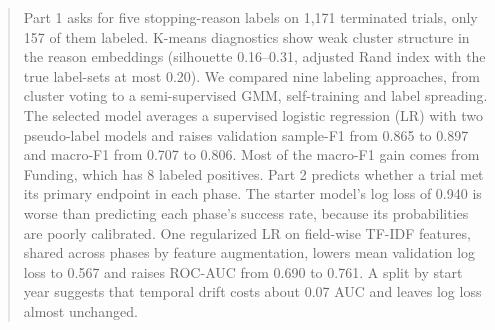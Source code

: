 \begin{abstract}
Part 1 asks for five stopping-reason labels on 1,171 terminated trials, only 157 of them labeled.
K-means diagnostics show weak cluster structure in the reason embeddings (silhouette 0.16--0.31, adjusted Rand index with the true label-sets at most 0.20).
We compared nine labeling approaches, from cluster voting to a semi-supervised GMM, self-training and label spreading.
The selected model averages a supervised logistic regression (LR) with two pseudo-label models and raises validation sample-F1 from 0.865 to 0.897 and macro-F1 from 0.707 to 0.806.
Most of the macro-F1 gain comes from Funding, which has 8 labeled positives.
Part 2 predicts whether a trial met its primary endpoint in each phase.
The starter model's log loss of 0.940 is worse than predicting each phase's success rate, because its probabilities are poorly calibrated.
One regularized LR on field-wise TF-IDF features, shared across phases by feature augmentation, lowers mean validation log loss to 0.567 and raises ROC-AUC from 0.690 to 0.761.
A split by start year suggests that temporal drift costs about 0.07 AUC and leaves log loss almost unchanged.
\end{abstract}
